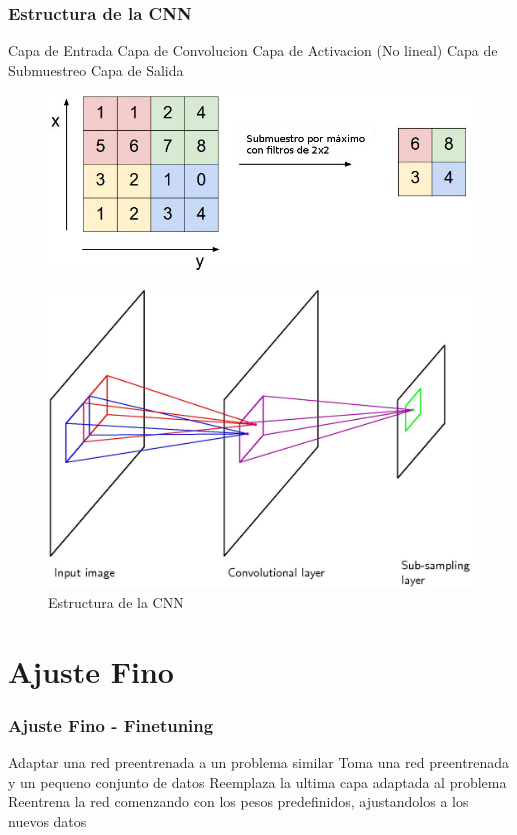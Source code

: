 \documentclass[12pt,center]{beamer}
\begin{document}
\begin{frame}
  \frametitle{Estructura de la CNN}
  Capa de Entrada
  Capa de Convolucion
  Capa de Activacion (No lineal)
  Capa de Submuestreo
  Capa de Salida
  \begin{figure}[H]
    \begin{center}
      \includegraphics[width=0.8\linewidth]{./img/stanford_maxpool_spanish.jpeg}
    \end{center}
  \end{figure}
      
  \begin{figure}[h]
    \begin{center}
    \includegraphics[width=0.8\linewidth]{./img/bishop_cnn.jpg}
    \end{center}
    \caption{Estructura de la CNN}
    \label{fig:convolution}
  \end{figure}
\end{frame}

\section{Ajuste Fino}
\begin{frame}
  \frametitle{Ajuste Fino - Finetuning}
  Adaptar una red preentrenada a un problema similar
  Toma una red preentrenada y un pequeno conjunto de datos
  Reemplaza la ultima capa adaptada al problema
  Reentrena la red comenzando con los pesos predefinidos, ajustandolos a los nuevos datos
\end{frame}
\end{document}
